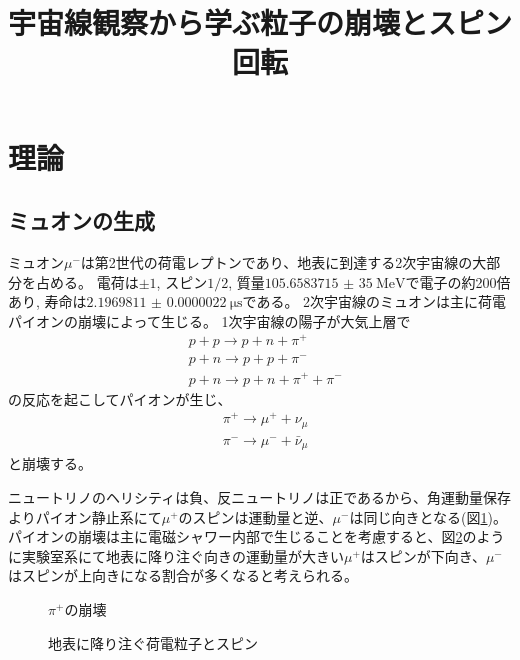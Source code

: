 \documentclass[dvipdfmx]{jsarticle}
\title{宇宙線観察から学ぶ粒子の崩壊とスピン回転
}
\begin{document}
\maketitle

\section{理論}

\subsection{ミュオンの生成}
\label{sec: theory: generation of muon}

ミュオン$\mu^-$は第2世代の荷電レプトンであり、地表に到達する2次宇宙線の大部分を占める。
電荷は$\pm1$, スピン$1/2$, 質量$\SI[]{105.658 3715(35)}[]{\MeV}$で電子の約200倍あり, 寿命は$\SI{2.1969811(22)}{\micro\second}$である。
2次宇宙線のミュオンは主に荷電パイオンの崩壊によって生じる。
1次宇宙線の陽子が大気上層で
\begin{align*}
    &p+p\to p+n+\pi^+
    \\
    &p+n\to p+p+\pi^-
    \\
    &p+n\to p+n+\pi^++\pi^-
\end{align*}
の反応を起こしてパイオンが生じ、
\begin{align*}
    &\pi^+\to\mu^++\nu_\mu
    \\
    &\pi^-\to\mu^-+\bar{\nu}_\mu
\end{align*}
と崩壊する。

ニュートリノのヘリシティは負、反ニュートリノは正であるから、角運動量保存よりパイオン静止系にて$\mu^+$のスピンは運動量と逆、$\mu^-$は同じ向きとなる(図\ref{fig: pion decay})。
パイオンの崩壊は主に電磁シャワー内部で生じることを考慮すると、図\ref{fig: muon shower}のように実験室系にて地表に降り注ぐ向きの運動量が大きい$\mu^+$はスピンが下向き、$\mu^-$はスピンが上向きになる割合が多くなると考えられる。

\begin{figure}
    \centering
    
    \caption{$\pi^+$の崩壊}
    \label{fig: pion decay}
\end{figure}

\begin{figure}
    \centering
    
    \caption{地表に降り注ぐ荷電粒子とスピン}
    \label{fig: muon shower}
\end{figure}
\end{document}
